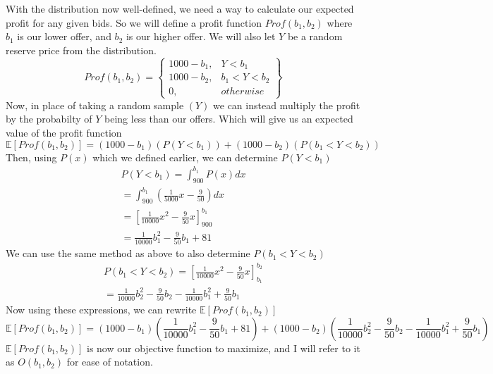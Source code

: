 \documentclass{article}
\begin{document}
With the distribution now well-defined, we need a way to calculate our expected profit for any given
bids.
So we will define a profit function $Prof(b_1, b_2)$ where $b_1$ is our lower offer, and $b_2$ is our
higher offer. We will also let $Y$ be a random reserve price from the distribution.
\begin{equation}
    Prof(b_1, b_2) = 
    \left\{
        \begin{array}{lr}
            1000 - b_1, & Y < b_1 \\
            1000 - b_2, & b_1 < Y < b_2 \\
            0, & otherwise
        \end{array}
    \right\}
\end{equation}
Now, in place of taking a random sample $(Y)$ we can instead multiply the profit by the probabilty of $Y$ being less
than our offers.
Which will give us an expected value of the profit function
\begin{equation}
    \mathbb{E}[Prof(b_1, b_2)] = (1000 - b_1)(P(Y < b_1)) + (1000 - b_2)(P(b_1 < Y < b_2))
\end{equation}
Then, using $P(x)$ which we defined earlier, we can determine $P(Y < b_1)$
\begin{gather}
    P(Y < b_1) = \int_{900}^{b_1}P(x)dx \\
    = \int_{900}^{b_1}(\frac{1}{5000}x-\frac{9}{50})dx \\
    = \left[
        \frac{1}{10000}x^2 - \frac{9}{50}x
    \right]_{900}^{b_1} \\
    = \frac{1}{10000}b_1^2 - \frac{9}{50}b_1 + 81
\end{gather}
We can use the same method as above to also determine $P(b_1 < Y < b_2)$
\begin{gather}
    P(b_1 < Y < b_2)
    = \left[
        \frac{1}{10000}x^2 - \frac{9}{50}x
    \right]_{b_1}^{b_2} \\
    = \frac{1}{10000}b_2^2 - \frac{9}{50}b_2 - \frac{1}{10000}b_1^2
    + \frac{9}{50}b_1
\end{gather}
Now using these expressions, we can rewrite $\mathbb{E}[Prof(b_1, b_2)]$
\begin{dmath}
    \mathbb{E}[Prof(b_1, b_2)] = (1000 - b_1)\left(\frac{1}{10000}b_1^2 - \frac{9}{50}b_1 + 81\right)
    + (1000 - b_2)\left(\frac{1}{10000}b_2^2 - \frac{9}{50}b_2 - \frac{1}{10000}b_1^2 + \frac{9}{50}b_1\right)
\end{dmath}
$\mathbb{E}[Prof(b_1, b_2)]$ is now our objective function to maximize, and I will refer to it as $O(b_1, b_2)$
for ease of notation.
\end{document}
